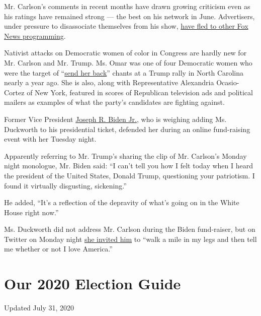 Mr. Carlson's comments in recent months have drawn growing criticism
even as his ratings have remained strong --- the best on his network in
June. Advertisers, under pressure to disassociate themselves from his
show,
\href{https://www.nytimes.com/2020/06/18/business/media/tucker-carlson-advertisers-ratings.html}{have
fled to other Fox News programming}.

Nativist attacks on Democratic women of color in Congress are hardly new
for Mr. Carlson and Mr. Trump. Ms. Omar was one of four Democratic women
who were the target of
``\href{https://www.nytimes.com/2019/07/17/us/politics/trump-send-her-back-ilhan-omar.html}{send
her back}'' chants at a Trump rally in North Carolina nearly a year ago.
She is also, along with Representative Alexandria Ocasio-Cortez of New
York, featured in scores of Republican television ads and political
mailers as examples of what the party's candidates are fighting against.

Former Vice President
\href{https://www.nytimes.com/interactive/2020/us/elections/joe-biden.html}{Joseph
R. Biden Jr.}, who is weighing adding Ms. Duckworth to his presidential
ticket, defended her during an online fund-raising event with her
Tuesday night.

Apparently referring to Mr. Trump's sharing the clip of Mr. Carlson's
Monday night monologue, Mr. Biden said: ``I can't tell you how I felt
today when I heard the president of the United States, Donald Trump,
questioning your patriotism. I found it virtually disgusting,
sickening.''

He added, ``It's a reflection of the depravity of what's going on in the
White House right now.''

Ms. Duckworth did not address Mr. Carlson during the Biden fund-raiser,
but on Twitter on Monday night
\href{https://twitter.com/SenDuckworth/status/1280313123887603712}{she
invited him} to ``walk a mile in my legs and then tell me whether or not
I love America.''

\hypertarget{our-2020-election-guide}{%
\section{Our 2020 Election Guide}\label{our-2020-election-guide}}

Updated July 31, 2020

